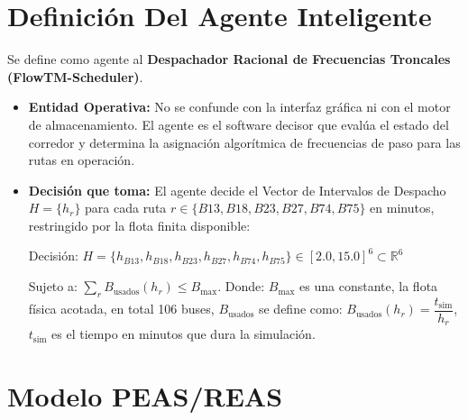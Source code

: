 \documentclass{article}
\begin{document}
\section{Definición Del Agente Inteligente}

Se define como agente al \textbf{Despachador Racional de Frecuencias Troncales (FlowTM-Scheduler)}.

\begin{itemize}
  \item \textbf{Entidad Operativa:} No se confunde con la interfaz gráfica ni con el motor de almacenamiento. El agente es el software decisor que evalúa el estado del corredor y determina la asignación algorítmica de frecuencias de paso para las rutas en operación.
  \item \textbf{Decisión que toma:} El agente decide el Vector de Intervalos de Despacho \(H = \{h_r\}\) para cada ruta \(r \in \{B13, B18, B23, B27, B74, B75\}\) en minutos, restringido por la flota finita disponible:

        Decisión: \(H = \{ h_{B13}, h_{B18}, h_{B23}, h_{B27}, h_{B74}, h_{B75}\} \in [2.0, 15.0]^6 \subset \mathbb{R}^6\)

        Sujeto a: \(\sum_r B_{\mathrm{usados}}(h_r) \leq B_{\mathrm{max}}\). Donde: \(B_{\mathrm{max}}\) es una constante, la flota física acotada, en total 106 buses, \(B_{\mathrm{usados}}\) se define como: \(B_{\mathrm{usados}}(h_r) = \dfrac{t_{\mathrm{sim}}}{h_r}\), \(t_{\mathrm{sim}}\) es el tiempo en minutos que dura la simulación.

\end{itemize}

\section{Modelo PEAS/REAS}
\end{document}
